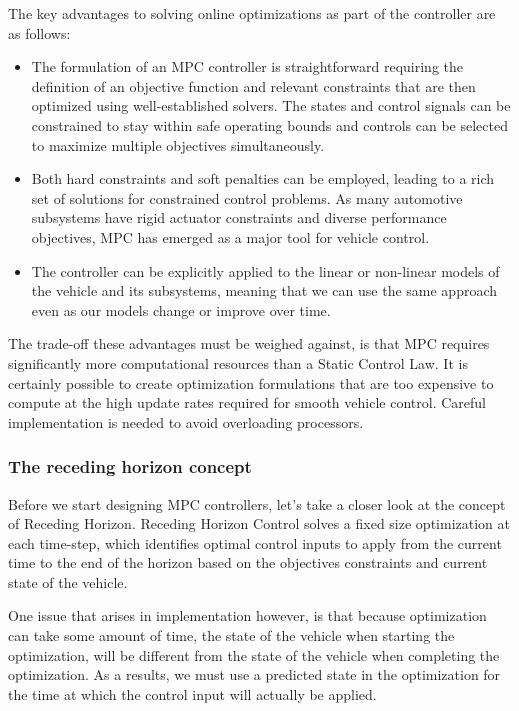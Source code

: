 The key advantages to solving online optimizations as part of
the controller are as follows: 

\begin{itemize}

\item The formulation of an MPC controller is straightforward requiring the definition of an objective function
and relevant constraints that are then optimized using well-established solvers. The states and control signals
can be constrained to stay within safe operating bounds and controls can be selected to maximize multiple objectives simultaneously. 
\item Both hard constraints and soft penalties can be employed, leading to a rich set of solutions for constrained control problems. As many automotive subsystems have rigid actuator constraints and diverse performance objectives, MPC has emerged as a major tool for vehicle control. 
\item The controller can be explicitly applied to the linear or non-linear models of the vehicle and its subsystems, meaning that we can
use the same approach even as our models change or improve over time. 
\end{itemize}

The trade-off these advantages must be weighed against, is that MPC requires significantly more
computational resources than a Static Control Law. It is certainly possible to create optimization formulations
that are too expensive to compute at the high update rates required
for smooth vehicle control. Careful implementation is needed
to avoid overloading processors. 

\subsubsection{The receding horizon concept}
\label{receding_horizon_concept}

Before we start designing
MPC controllers, let's take a closer look at
the concept of Receding Horizon. Receding Horizon Control solves a fixed size optimization
at each time-step, which identifies
optimal control inputs to apply from the current time to the end of the horizon based on the objectives constraints and
current state of the vehicle. 

One issue that arises in
implementation however, is that because optimization
can take some amount of time, the state of the vehicle when
starting the optimization, will be different from the state of the vehicle when completing
the optimization. As a results, we must
use a predicted state in the optimization for
the time at which the control input will
actually be applied. 

